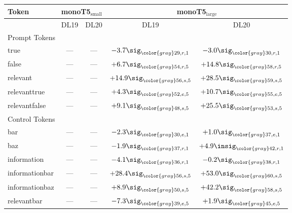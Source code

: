 \begin{table}
    \centering
    \footnotesize
    \setlength{\tabcolsep}{2pt}
    \begin{tabular}{@{}lcccc@{}}
    \toprule
    Token & \multicolumn{2}{c}{monoT5$_\text{small}$} & \multicolumn{2}{c}{monoT5$_\text{large}$}\\
    \midrule
    & \multicolumn{1}{c}{DL19} & \multicolumn{1}{c}{DL20} & \multicolumn{1}{c}{DL19} & \multicolumn{1}{c}{DL20}\\
    \midrule
    \midrule
    \multicolumn{5}{l}{Prompt Tokens}\\
    \midrule
    true & --- & --- & \cellcolor{neg!3}$-3.7\sig_{\color{gray}29, r, 1}$ & \cellcolor{neg!3}$-3.0\sig_{\color{gray}30, r, 1}$\\
    false & --- & --- & \cellcolor{pos!6}$+6.7\sig_{\color{gray}54, r, 5}$ & \cellcolor{pos!14}$+14.8\sig_{\color{gray}58, r, 5}$\\
    relevant & --- & --- & \cellcolor{pos!14}$+14.9\sig_{\color{gray}56, s, 5}$ & \cellcolor{pos!27}$+28.5\sig_{\color{gray}59, s, 5}$\\
    relevanttrue & --- & --- & \cellcolor{pos!4}$+4.3\sig_{\color{gray}52, e, 5}$ & \cellcolor{pos!10}$+10.7\sig_{\color{gray}55, e, 5}$\\
    relevantfalse & --- & --- & \cellcolor{pos!9}$+9.1\sig_{\color{gray}48, s, 5}$ & \cellcolor{pos!24}$+25.5\sig_{\color{gray}53, s, 5}$\\
    \midrule
    \multicolumn{5}{l}{Control Tokens}\\
    \midrule
    bar & --- & --- & \cellcolor{neg!2}$-2.3\sig_{\color{gray}30, e, 1}$ & \cellcolor{pos!1}$+1.0\sig_{\color{gray}37, e, 1}$\\
    baz & --- & --- & \cellcolor{neg!2}$-1.9\sig_{\color{gray}37, r, 1}$ & \cellcolor{pos!5}$+4.9\insig_{\color{gray}42, r, 1}$\\
    information & --- & --- & \cellcolor{neg!4}$-4.1\sig_{\color{gray}36, r, 1}$ & \cellcolor{neg!0}$-0.2\sig_{\color{gray}38, r, 1}$\\
    informationbar & --- & --- & \cellcolor{pos!27}$+28.4\sig_{\color{gray}56, s, 5}$ & \cellcolor{pos!50}$+53.0\sig_{\color{gray}60, s, 5}$\\
    informationbaz & --- & --- & \cellcolor{pos!8}$+8.9\sig_{\color{gray}50, s, 5}$ & \cellcolor{pos!40}$+42.2\sig_{\color{gray}58, s, 5}$\\
    relevantbar & --- & --- & \cellcolor{neg!7}$-7.3\sig_{\color{gray}39, e, 5}$ & \cellcolor{pos!2}$+1.9\sig_{\color{gray}45, e, 5}$\\

\end{tabular}
\end{table}
